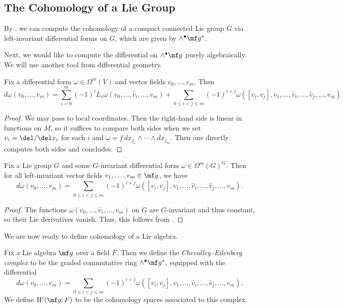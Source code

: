\documentclass[../notes.tex]{subfiles}
\begin{document}
\subsection{The Cohomology of a Lie Group}
By , we can compute the cohomology of a compact connected Lie group $G$ via left-invariant differential forms on $G$, which are given by $\land^\bullet\mf g^*$.

Next, we would like to compute the differential on $\land^\bullet\mf g$ purely algebraically. We will use another tool from differential geometry.
\begin{proposition} \label{prop:cartan-diff-formula}
	Fix a differential form $\omega\in\Omega^m(V)$ and vector fields $v_0,\ldots,v_m$. Then
	\[d\omega(v_0,\ldots,v_m)=\sum_{i=0}^m(-1)^iL_v\omega(v_0,\ldots,\widehat v_i,\ldots,v_m)+\sum_{0\le i<j\le m}(-1)^{i+j}\omega([v_i,v_j],v_1,\ldots,\widehat v_i,\ldots,\widehat v_j,\ldots,v_m)\]
\end{proposition}
\begin{proof}
	We may pass to local coordinates. Then the right-hand side is linear in functions on $M$, so it suffices to compare both sides when we set $v_i=\del/\del x_i$ for each $i$ and $\omega=f\,dx_{j_1}\land\cdots\land dx_{j_m}$. Then one directly computes both sides and concludes.
\end{proof}
\begin{corollary} \label{cor:differential-of-chev-eilenberg}
	Fix a Lie group $G$ and some $G$-invariant differential form $\omega\in\Omega^m(G)^G$. Then for all left-invariant vector fields $v_1,\ldots,v_m\in\mf g$, we have
	\[d\omega(v_0,\ldots,v_m)=\sum_{0\le i<j\le m}(-1)^{i+j}\omega([v_i,v_j],v_1,\ldots,\widehat v_i,\ldots,\widehat v_j,\ldots,v_m).\]
\end{corollary}
\begin{proof}
	The functions $\omega(v_0,\ldots,\widehat v_i,\ldots,v_m)$ on $G$ are $G$-invariant and thus constant, so their Lie derivatives vanish. Thus, this follows from .
\end{proof}
We are now ready to define cohomology of a Lie algebra.
\begin{definition}
	Fix a Lie algebra $\mf g$ over a field $F$. Then we define the \textit{Chevalley--Eilenberg complex} to be the graded commutative ring $\land^\bullet\mf g^*$, equipped with the differential
	\[d\omega(v_0,\ldots,v_m)=\sum_{0\le i<j\le m}(-1)^{i+j}\omega([v_i,v_j],v_1,\ldots,\widehat v_i,\ldots,\widehat v_j,\ldots,v_m).\]
	We define $\mathrm H^i(\mf g;F)$ to be the cohomology spaces associated to this complex.
\end{definition}
\end{document}

